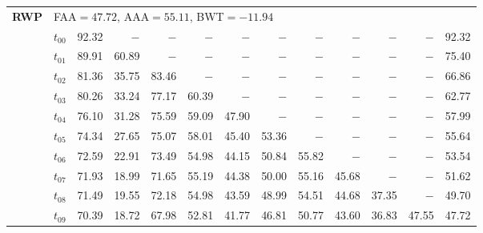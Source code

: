 \begin{table}[ht]
\begin{tabular}{@{}l l r r r r r r r r r r r@{}}
\midrule
\multirow{11}{*}{\textbf{RWP}} & \multicolumn{12}{l}{\quad\small FAA$=47.72$,\; AAA$=55.11$,\; BWT$=-11.94$} \\
 & $t_{00}$ & 92.32 & $-$ & $-$ & $-$ & $-$ & $-$ & $-$ & $-$ & $-$ & $-$ & 92.32 \\
 & $t_{01}$ & 89.91 & 60.89 & $-$ & $-$ & $-$ & $-$ & $-$ & $-$ & $-$ & $-$ & 75.40 \\
 & $t_{02}$ & 81.36 & 35.75 & 83.46 & $-$ & $-$ & $-$ & $-$ & $-$ & $-$ & $-$ & 66.86 \\
 & $t_{03}$ & 80.26 & 33.24 & 77.17 & 60.39 & $-$ & $-$ & $-$ & $-$ & $-$ & $-$ & 62.77 \\
 & $t_{04}$ & 76.10 & 31.28 & 75.59 & 59.09 & 47.90 & $-$ & $-$ & $-$ & $-$ & $-$ & 57.99 \\
 & $t_{05}$ & 74.34 & 27.65 & 75.07 & 58.01 & 45.40 & 53.36 & $-$ & $-$ & $-$ & $-$ & 55.64 \\
 & $t_{06}$ & 72.59 & 22.91 & 73.49 & 54.98 & 44.15 & 50.84 & 55.82 & $-$ & $-$ & $-$ & 53.54 \\
 & $t_{07}$ & 71.93 & 18.99 & 71.65 & 55.19 & 44.38 & 50.00 & 55.16 & 45.68 & $-$ & $-$ & 51.62 \\
 & $t_{08}$ & 71.49 & 19.55 & 72.18 & 54.98 & 43.59 & 48.99 & 54.51 & 44.68 & 37.35 & $-$ & 49.70 \\
 & $t_{09}$ & 70.39 & 18.72 & 67.98 & 52.81 & 41.77 & 46.81 & 50.77 & 43.60 & 36.83 & 47.55 & 47.72 \\
\bottomrule
\end{tabular}
\end{table}
